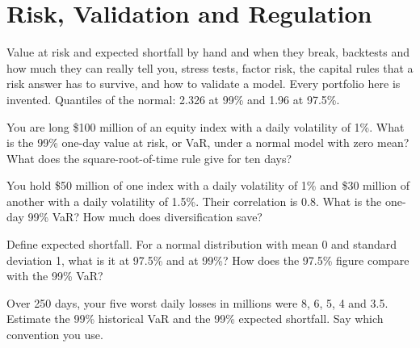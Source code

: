 \chapter{Risk, Validation and Regulation}\label{ch:iv2:risk-validation-and-regulation}

\begin{ivtrains}
Value at risk and expected shortfall by hand and when they break, backtests and how much they can really tell you, stress tests, factor risk, the capital rules that a risk answer has to survive, and how to validate a model. Every portfolio here is invented. Quantiles of the normal: 2.326 at 99\% and 1.96 at 97.5\%.
\end{ivtrains}

\begin{question}\label{iq:iv2:risk-validation-and-regulation:1}
You are long \$100 million of an equity index with a daily volatility of 1\%. What is the 99\% one-day value at risk, or VaR, under a normal model with zero mean? What does the square-root-of-time rule give for ten days?
\end{question}

\begin{question}\label{iq:iv2:risk-validation-and-regulation:2}
You hold \$50 million of one index with a daily volatility of 1\% and \$30 million of another with a daily volatility of 1.5\%. Their correlation is 0.8. What is the one-day 99\% VaR? How much does diversification save?
\end{question}

\begin{question}\label{iq:iv2:risk-validation-and-regulation:3}
Define expected shortfall. For a normal distribution with mean 0 and standard deviation 1, what is it at 97.5\% and at 99\%? How does the 97.5\% figure compare with the 99\% VaR?
\end{question}

\begin{question}\label{iq:iv2:risk-validation-and-regulation:4}
Over 250 days, your five worst daily losses in millions were 8, 6, 5, 4 and 3.5. Estimate the 99\% historical VaR and the 99\% expected shortfall. Say which convention you use.
\end{question}

